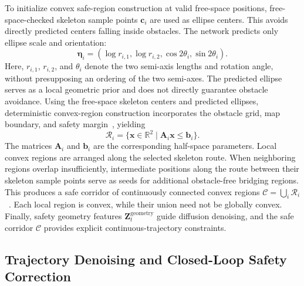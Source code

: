 \documentclass[journal]{IEEEtran}
\begin{document}
To initialize convex safe-region construction at valid free-space positions,
free-space-checked skeleton sample points $\mathbf c_i$ are used as ellipse
centers. This avoids directly predicted centers falling inside obstacles. The
network predicts only ellipse scale and orientation:
\begin{equation}
\boldsymbol\eta_i=(\log r_{i,1},\log r_{i,2},\cos 2\theta_i,\sin 2\theta_i).
\end{equation}
Here, $r_{i,1}$, $r_{i,2}$, and $\theta_i$ denote the two semi-axis lengths
and rotation angle, without presupposing an ordering of the two semi-axes.
The predicted ellipse serves as a local geometric prior and does not directly
guarantee obstacle avoidance. Using the free-space skeleton centers and
predicted ellipses, deterministic convex-region construction incorporates the
obstacle grid, map boundary, and safety margin~\cite{iris,firi}, yielding
\begin{equation}
\mathcal R_i=\{\mathbf x\in\mathbb R^2\mid\mathbf A_i\mathbf x\leq\mathbf b_i\}.
\end{equation}
The matrices $\mathbf A_i$ and $\mathbf b_i$ are the corresponding half-space
parameters. Local convex regions are arranged along the selected skeleton
route. When neighboring regions overlap insufficiently, intermediate positions
along the route between their skeleton sample points serve as seeds for
additional obstacle-free bridging regions. This produces a safe corridor of
continuously connected convex regions
$\mathcal C=\bigcup_i\mathcal R_i$~\cite{sfc,bound}. Each local region is
convex, while their union need not be globally convex. Finally, safety geometry
features $\mathbf Z_t^{\mathrm{geometry}}$ guide diffusion denoising, and the
safe corridor $\mathcal C$ provides explicit continuous-trajectory constraints.

\subsection{Trajectory Denoising and Closed-Loop Safety Correction}
\end{document}
